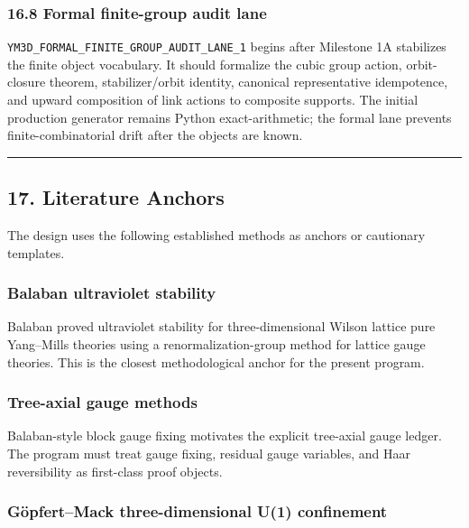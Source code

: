 \documentclass[
]{article}
\begin{document}
\subsubsection{16.8 Formal finite-group audit
lane}\label{formal-finite-group-audit-lane}

\texttt{YM3D\_FORMAL\_FINITE\_GROUP\_AUDIT\_LANE\_1} begins after
Milestone 1A stabilizes the finite object vocabulary. It should
formalize the cubic group action, orbit-closure theorem,
stabilizer/orbit identity, canonical representative idempotence, and
upward composition of link actions to composite supports. The initial
production generator remains Python exact-arithmetic; the formal lane
prevents finite-combinatorial drift after the objects are known.

\begin{center}\rule{0.5\linewidth}{0.5pt}\end{center}

\subsection{17. Literature Anchors}\label{literature-anchors}

The design uses the following established methods as anchors or
cautionary templates.

\subsubsection{Balaban ultraviolet
stability}\label{balaban-ultraviolet-stability}

Balaban proved ultraviolet stability for three-dimensional Wilson
lattice pure Yang--Mills theories using a renormalization-group method
for lattice gauge theories. This is the closest methodological anchor
for the present program.

\subsubsection{Tree-axial gauge methods}\label{tree-axial-gauge-methods}

Balaban-style block gauge fixing motivates the explicit tree-axial gauge
ledger. The program must treat gauge fixing, residual gauge variables,
and Haar reversibility as first-class proof objects.

\subsubsection{Göpfert--Mack three-dimensional U(1)
confinement}\label{guxf6pfertmack-three-dimensional-u1-confinement}
\end{document}
